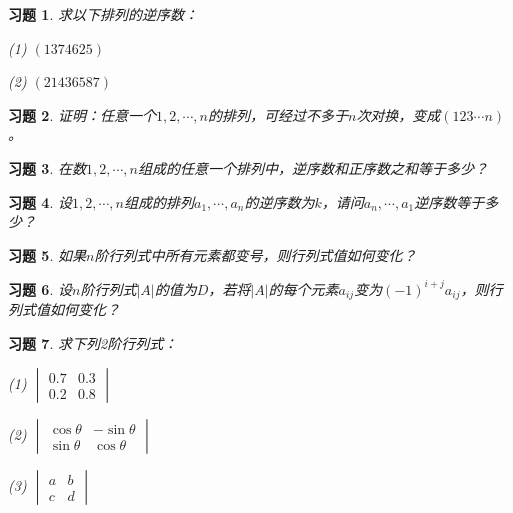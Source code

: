 \documentclass[a4paper]{book}
\newtheorem{ex}{习题}[chapter]
\newcommand{\enum}{\begin{list}{}{\setlength{\leftmargin}{0pt} \setlength{\itemindent}{2.5em} \setlength{\listparindent}{2em}}}
\begin{document}
\begin{ex} \label{ex:2.1}
求以下排列的逆序数：

\enum
\item[(1)] $(1374625)$
\item[(2)] $(21436587)$
\end{list}
\end{ex}

\begin{ex} \label{ex:2.2}
证明：任意一个$1,2,\cdots,n$的排列，可经过不多于$n$次对换，变成$(123\cdots n)$。
\end{ex}

\begin{ex} \label{ex:2.3}
在数$1,2,\cdots,n$组成的任意一个排列中，逆序数和正序数之和等于多少？
\end{ex}

\begin{ex} \label{ex:2.4}
设$1,2,\cdots,n$组成的排列$a_1,\cdots,a_n$的逆序数为$k$，请问$a_n,\cdots,a_1$逆序数等于多少？
\end{ex}

\begin{ex} \label{ex:2.5}
如果$n$阶行列式中所有元素都变号，则行列式值如何变化？
\end{ex}

\begin{ex} \label{ex:2.6}
设$n$阶行列式$|A|$的值为$D$，若将$|A|$的每个元素$a_{ij}$变为$(-1)^{i+j}a_{ij}$，则行列式值如何变化？
\end{ex}

\begin{ex} \label{ex:2.7}
求下列2阶行列式：

\enum
\item[(1)] $\begin{vmatrix} 0.7 & 0.3 \\ 0.2 & 0.8 \end{vmatrix}$
\item[(2)] $\begin{vmatrix} \cos\theta & -\sin\theta \\ \sin\theta & \cos\theta \end{vmatrix}$
\item[(3)] $\begin{vmatrix} a & b \\ c & d \end{vmatrix}$
\end{list}
\end{ex}
\end{document}

